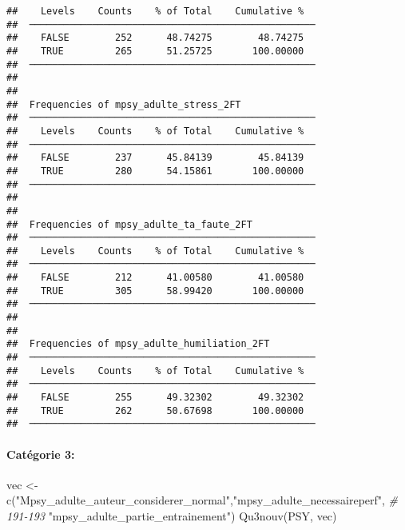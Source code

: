\documentclass[
]{article}
\newenvironment{Shaded}{\begin{snugshade}}{\end{snugshade}}
\newcommand{\CommentTok}[1]{\textcolor[rgb]{0.56,0.35,0.01}{\textit{#1}}}
\newcommand{\FunctionTok}[1]{\textcolor[rgb]{0.00,0.00,0.00}{#1}}
\newcommand{\NormalTok}[1]{#1}
\newcommand{\OtherTok}[1]{\textcolor[rgb]{0.56,0.35,0.01}{#1}}
\newcommand{\StringTok}[1]{\textcolor[rgb]{0.31,0.60,0.02}{#1}}
\begin{document}
\begin{verbatim}
##    Levels    Counts    % of Total    Cumulative %   
##  ────────────────────────────────────────────────── 
##    FALSE        252      48.74275        48.74275   
##    TRUE         265      51.25725       100.00000   
##  ────────────────────────────────────────────────── 
## 
## 
##  Frequencies of mpsy_adulte_stress_2FT              
##  ────────────────────────────────────────────────── 
##    Levels    Counts    % of Total    Cumulative %   
##  ────────────────────────────────────────────────── 
##    FALSE        237      45.84139        45.84139   
##    TRUE         280      54.15861       100.00000   
##  ────────────────────────────────────────────────── 
## 
## 
##  Frequencies of mpsy_adulte_ta_faute_2FT            
##  ────────────────────────────────────────────────── 
##    Levels    Counts    % of Total    Cumulative %   
##  ────────────────────────────────────────────────── 
##    FALSE        212      41.00580        41.00580   
##    TRUE         305      58.99420       100.00000   
##  ────────────────────────────────────────────────── 
## 
## 
##  Frequencies of mpsy_adulte_humiliation_2FT         
##  ────────────────────────────────────────────────── 
##    Levels    Counts    % of Total    Cumulative %   
##  ────────────────────────────────────────────────── 
##    FALSE        255      49.32302        49.32302   
##    TRUE         262      50.67698       100.00000   
##  ──────────────────────────────────────────────────
\end{verbatim}

\hypertarget{catuxe9gorie-3-1}{%
\paragraph{Catégorie 3:}\label{catuxe9gorie-3-1}}

\begin{Shaded}
\begin{Highlighting}[]
\NormalTok{vec }\OtherTok{\textless{}{-}} \FunctionTok{c}\NormalTok{(}\StringTok{"Mpsy\_adulte\_auteur\_considerer\_normal"}\NormalTok{,}\StringTok{"mpsy\_adulte\_necessaireperf"}\NormalTok{,   }\CommentTok{\# 191{-}193}
        \StringTok{"mpsy\_adulte\_partie\_entrainement"}\NormalTok{) }
\FunctionTok{Qu3nouv}\NormalTok{(PSY, vec)}
\end{Highlighting}
\end{Shaded}
\end{document}
